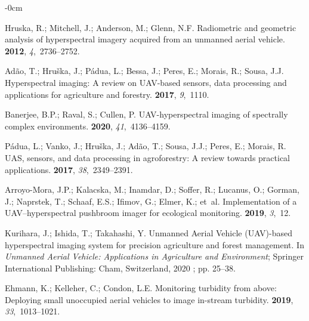 \documentclass[remotesensing,article,accept,pdftex,moreauthors]{Definitions/mdpi}
\begin{document}
\begin{adjustwidth}{-\extralength}{0cm}
\begin{thebibliography}{999}
Hruska, R.; Mitchell, J.; Anderson, M.; Glenn, N.F.
\newblock Radiometric and geometric analysis of hyperspectral imagery acquired
  from an unmanned aerial vehicle.
 {\bf 2012}, {\em 4},~2736--2752.

Ad{\~a}o, T.; Hru{\v{s}}ka, J.; P{\'a}dua, L.; Bessa, J.; Peres, E.; Morais,
  R.; Sousa, J.J.
\newblock Hyperspectral imaging: A review on UAV-based sensors, data processing
  and applications for agriculture and forestry.
 {\bf 2017}, {\em 9},~1110.

Banerjee, B.P.; Raval, S.; Cullen, P.
\newblock UAV-hyperspectral imaging of spectrally complex environments.
 {\bf 2020}, {\em
  41},~4136--4159.

P{\'a}dua, L.; Vanko, J.; Hru{\v{s}}ka, J.; Ad{\~a}o, T.; Sousa, J.J.; Peres,
  E.; Morais, R.
\newblock UAS, sensors, and data processing in agroforestry: A review towards
  practical applications.
 {\bf 2017}, {\em
  38},~2349--2391.

Arroyo-Mora, J.P.; Kalacska, M.; Inamdar, D.; Soffer, R.; Lucanus, O.; Gorman,
  J.; Naprstek, T.; Schaaf, E.S.; Ifimov, G.; Elmer, K.;  et~al.
\newblock Implementation of a UAV--hyperspectral pushbroom imager for
  ecological monitoring.
 {\bf 2019}, {\em 3},~12.

Kurihara, J.; Ishida, T.; Takahashi, Y.
\newblock Unmanned Aerial Vehicle (UAV)-based hyperspectral imaging system for
  precision agriculture and forest management.
\newblock In {\em Unmanned Aerial Vehicle: Applications in Agriculture and
  Environment}; Springer International Publishing: Cham, Switzerland, 2020 %
; pp. 25--38.

Ehmann, K.; Kelleher, C.; Condon, L.E.
\newblock Monitoring turbidity from above: Deploying small unoccupied aerial
  vehicles to image in-stream turbidity.
 {\bf 2019}, {\em 33},~1013--1021.


\end{thebibliography}
\end{adjustwidth}
\end{document}
